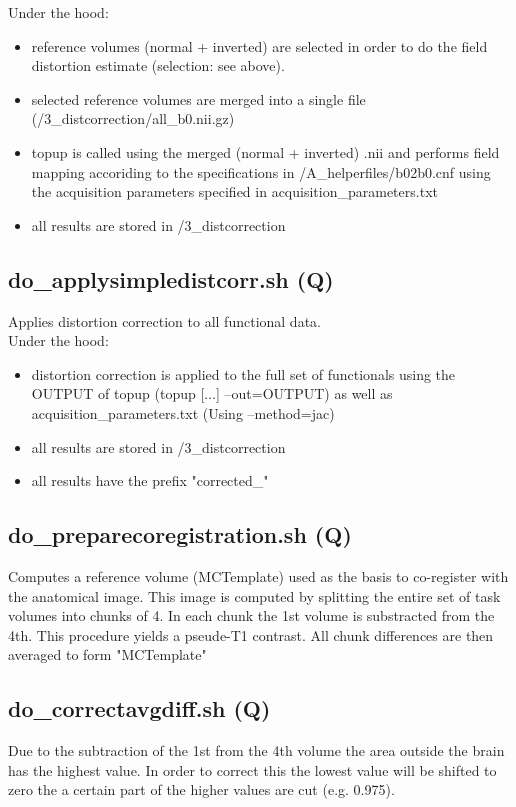 \documentclass[12pt,a4paper]{scrartcl}
\begin{document}
\noindent Under the hood:
\begin{itemize}
\item reference volumes (normal + inverted) are selected in order to do the field distortion estimate (selection: see above).
\item selected reference volumes are merged into a single file (/3\_distcorrection/all\_b0.nii.gz)
\item topup is called using the merged (normal + inverted) .nii and performs field mapping accoriding to the specifications in /A\_helperfiles/b02b0.cnf using the acquisition parameters specified in acquisition\_parameters.txt
\item all results are stored in /3\_distcorrection
\end{itemize}

\subsection{do\_applysimpledistcorr.sh (Q)}
\label{sec:applydistcorr}
Applies distortion correction to all functional data.\\

\noindent Under the hood:
\begin{itemize}
\item distortion correction is applied to the full set of functionals using the OUTPUT of topup (topup [$\ldots$] --out=OUTPUT) as well as acquisition\_parameters.txt (Using --method=jac)
\item all results are stored in /3\_distcorrection
\item all results have the prefix "corrected\_"
\end{itemize}

\subsection{do\_preparecoregistration.sh (Q)}
\label{sec:prepcoreg}
Computes a reference volume (MCTemplate) used as the basis  to co-register with the anatomical image. This image is computed by splitting the entire set of task volumes into chunks of 4. In each chunk the 1st volume is substracted from the 4th. This procedure yields a pseude-T1 contrast. All chunk differences are then averaged to form "MCTemplate"

\subsection{do\_correctavgdiff.sh (Q)}
\label{sec:corravg}
Due to the subtraction of the 1st from the 4th volume the area outside the brain has the highest value. In order to correct this the lowest value will be shifted to zero the a certain part of the higher values are cut (e.g. 0.975).\\
\end{document}

